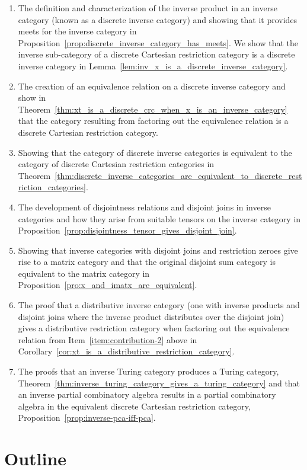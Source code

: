 \begin{enumerate}
\item The definition and characterization of the inverse product in an inverse category (known as a
  discrete inverse category) and showing  that it provides meets for the inverse category  in
  Proposition~\ref{prop:discrete_inverse_category_has_meets}. We show that the inverse sub-category
  of a discrete Cartesian restriction category is a discrete inverse category in
  Lemma~\ref{lem:inv_x_is_a_discrete_inverse_category}.
\item The creation of an equivalence relation on a discrete inverse category and show in
  Theorem~\ref{thm:xt_is_a_discrete_crc_when_x_is_an_inverse_category} that the category resulting
  from factoring out the equivalence relation is a discrete Cartesian restriction
  category.\label{item:contribution-2}
\item Showing that the category of discrete inverse categories is equivalent to the category of
  discrete Cartesian restriction categories in
  Theorem~\ref{thm:discrete_inverse_categories_are_equivalent_to_discrete_restriction_categories}.
\item The development of disjointness relations and disjoint joins in inverse categories and how
  they arise from suitable tensors on the inverse category in
  Proposition~\ref{prop:disjointness_tensor_gives_disjoint_join}.
\item Showing that inverse categories with disjoint joins and restriction zeroes give rise to a
  matrix category and that the original disjoint sum category is equivalent to the matrix category
  in Proposition~\ref{pro:x_and_imatx_are_equivalent}.
\item The proof that a distributive inverse category (one with inverse products and disjoint joins
  where the inverse product distributes over the disjoint join) gives a distributive restriction
  category when factoring out the equivalence relation from Item~\ref{item:contribution-2} above in
  Corollary~\ref{cor:xt_is_a_distributive_restriction_category}.
\item The proofs that an inverse Turing category produces a Turing category,
  Theorem~\ref{thm:inverse_turing_category_gives_a_turing_category} and that an inverse partial
  combinatory algebra results in a partial combinatory algebra in the equivalent discrete Cartesian
  restriction category, Proposition~\ref{prop:inverse-pca-iff-pca}.
\end{enumerate}

\section{Outline} %
\label{sec:outline}

